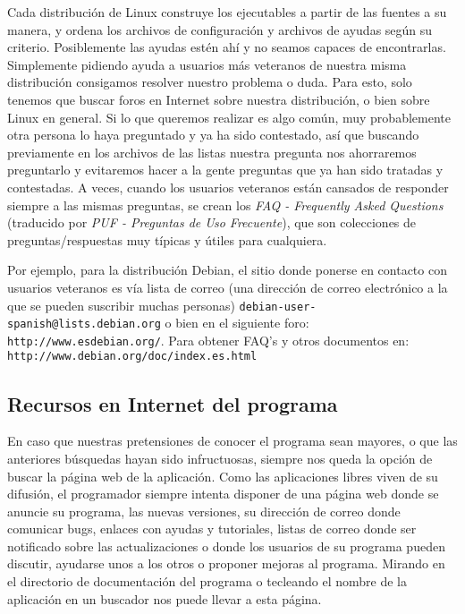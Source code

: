 Cada distribución de  Linux construye los ejecutables a  partir de las
fuentes a su manera, y ordena los archivos de configuración y archivos
de ayudas  según su criterio. Posiblemente  las ayudas estén ahí  y no
seamos capaces de encontrarlas.  Simplemente pidiendo ayuda a usuarios
más  veteranos  de  nuestra  misma  distribución  consigamos  resolver
nuestro problema o  duda. Para esto, solo tenemos que  buscar foros en
Internet sobre nuestra distribución, o bien sobre Linux en general. Si
lo que queremos realizar es algo común, muy probablemente otra persona
lo  haya  preguntado  y  ya  ha  sido  contestado,  así  que  buscando
previamente  en  los  archivos  de las  listas  nuestra  pregunta  nos
ahorraremos preguntarlo y evitaremos hacer a la gente preguntas que ya
han  sido  tratadas  y  contestadas.  A  veces,  cuando  los  usuarios
veteranos están cansados de responder  siempre a las mismas preguntas,
se crean  los {\em  FAQ - Frequently  Asked Questions}  (traducido por
{\em  PUF -  Preguntas  de  Uso Frecuente}),  que  son colecciones  de
preguntas/respuestas muy típicas y útiles para cualquiera.

Por ejemplo,  para la distribución  Debian, el sitio donde  ponerse en
contacto con usuarios veteranos es  vía lista de correo (una dirección
de correo  electrónico a la  que se pueden suscribir  muchas personas)
{\tt  debian-user-spanish@lists.debian.org}  o  bien en  el  siguiente
foro:  {\tt  http://www.esdebian.org/}.  Para obtener  FAQ's  y  otros
documentos en: {\tt http://www.debian.org/doc/index.es.html}


\subsection{Recursos en Internet del programa}

En caso que nuestras pretensiones de conocer el programa sean mayores,
o que  las anteriores búsquedas  hayan sido infructuosas,  siempre nos
queda la  opción de buscar  la página web  de la aplicación.  Como las
aplicaciones  libres  viven de  su  difusión,  el programador  siempre
intenta disponer de  una página web donde se anuncie  su programa, las
nuevas versiones, su dirección de correo donde comunicar bugs, enlaces
con ayudas y  tutoriales, listas de correo donde  ser notificado sobre
las  actualizaciones  o  donde  los usuarios  de  su  programa  pueden
discutir, ayudarse  unos a los  otros o proponer mejoras  al programa.
Mirando en el directorio de  documentación del programa o tecleando el
nombre de la aplicación en un buscador nos puede llevar a esta página.


